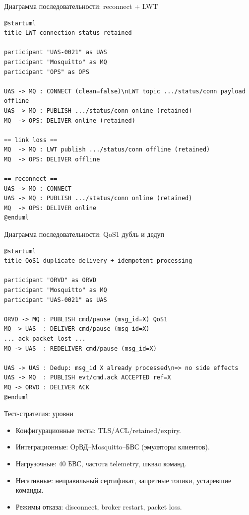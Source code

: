 \documentclass[aspectratio=169]{beamer}
\begin{document}
\begin{frame}{Диаграмма последовательности: reconnect + LWT}
\small
\begin{verbatim}
@startuml
title LWT connection status retained

participant "UAS-0021" as UAS
participant "Mosquitto" as MQ
participant "OPS" as OPS

UAS -> MQ : CONNECT (clean=false)\nLWT topic .../status/conn payload offline
UAS -> MQ : PUBLISH .../status/conn online (retained)
MQ  -> OPS: DELIVER online (retained)

== link loss ==
MQ  -> MQ : LWT publish .../status/conn offline (retained)
MQ  -> OPS: DELIVER offline

== reconnect ==
UAS -> MQ : CONNECT
UAS -> MQ : PUBLISH .../status/conn online (retained)
MQ  -> OPS: DELIVER online
@enduml
\end{verbatim}
\end{frame}

\begin{frame}{Диаграмма последовательности: QoS1 дубль и дедуп}
\small
\begin{verbatim}
@startuml
title QoS1 duplicate delivery + idempotent processing

participant "ORVD" as ORVD
participant "Mosquitto" as MQ
participant "UAS-0021" as UAS

ORVD -> MQ : PUBLISH cmd/pause (msg_id=X) QoS1
MQ -> UAS  : DELIVER cmd/pause (msg_id=X)
... ack packet lost ...
MQ -> UAS  : REDELIVER cmd/pause (msg_id=X)

UAS -> UAS : Dedup: msg_id X already processed\n=> no side effects
UAS -> MQ  : PUBLISH evt/cmd.ack ACCEPTED ref=X
MQ -> ORVD : DELIVER ACK
@enduml
\end{verbatim}
\end{frame}

\begin{frame}{Тест-стратегия: уровни}
\begin{itemize}
  \item Конфигурационные тесты: TLS/ACL/retained/expiry.
  \item Интеграционные: ОрВД--Mosquitto--БВС (эмуляторы клиентов).
  \item Нагрузочные: 40 БВС, частота telemetry, шквал команд.
  \item Негативные: неправильный сертификат, запретные топики, устаревшие команды.
  \item Режимы отказа: disconnect, broker restart, packet loss.
\end{itemize}
\end{frame}
\end{document}
